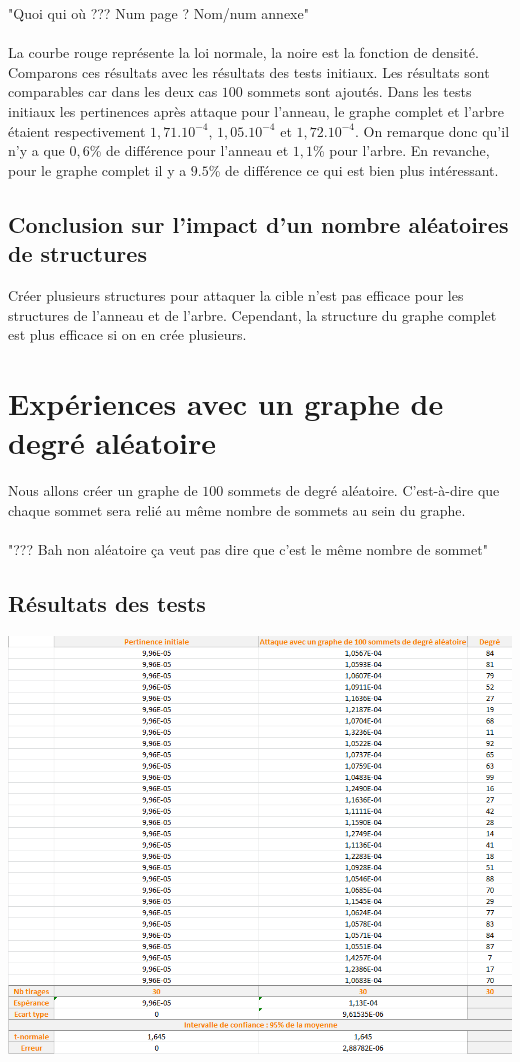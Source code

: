 \documentclass[a4paper,11pt]{article}
\begin{document}
		"Quoi qui où ??? Num page ? Nom/num annexe"\\
		\\
		La courbe rouge représente la loi normale, la noire est la fonction de densité.\\ 
		Comparons ces résultats avec les résultats des tests initiaux. Les résultats sont comparables car dans les deux cas $100$ sommets sont ajoutés. Dans les tests initiaux les pertinences après attaque pour l'anneau, le graphe complet et l'arbre étaient respectivement $1,71.10^{-4}$, $1,05.10^{-4}$ et $1,72.10^{-4}$. On remarque donc qu'il n'y a que $0,6$\% de différence pour l'anneau et $1,1$\% pour l'arbre. En revanche, pour le graphe complet il y a $9.5$\% de différence ce qui est bien plus intéressant.

	\subsection{Conclusion sur l'impact d'un nombre aléatoires de structures}
		Créer plusieurs structures pour attaquer la cible n'est pas efficace pour les structures de l'anneau et de l'arbre. Cependant, la structure du graphe complet est plus efficace si on en crée plusieurs. 

\section{Expériences avec un graphe de degré aléatoire}
	Nous allons créer un graphe de $100$ sommets de degré aléatoire. C'est-à-dire que chaque sommet sera relié au même nombre de sommets au sein du graphe.\\
	\\
	"??? Bah non aléatoire ça veut pas dire que c'est le même nombre de sommet"

	\subsection{Résultats des tests}
		\includegraphics[scale = 0.5]{Captures/ranking4.PNG}\\
		
	
\end{document}
